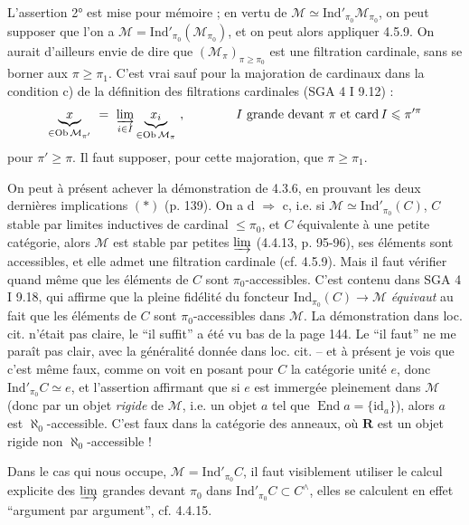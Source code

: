 \documentclass[11pt]{article}
\newcommand{\msp}[1]{\marginpar{\footnotesize [#1]}}
\newcommand{\Ind}{\mathrm{Ind}}
\begin{document}
L'assertion 2° est mise pour mémoire ; en vertu de $\mathcal{M}\simeq\Ind'_{\pi_0}\mathcal{M}_{\pi_0}$, on peut supposer que l'on a $\mathcal{M}=\Ind'_{\pi_0}(\mathcal{M}_{\pi_0})$, et on peut alors appliquer 4.5.9. On aurait d'ailleurs envie de dire que $(\mathcal{M}_\pi)_{\pi\geqslant\pi_0}$ est une filtration cardinale, sans se borner aux $\pi\geqslant\pi_1$. C'est vrai sauf pour la majoration de cardinaux dans la condition c) de la définition des filtrations cardinales (SGA 4 I 9.12) :
\[
\underbrace{x}_{\in\operatorname{Ob}\mathcal{M}_{\pi'}} \ =\ \varinjlim_{i\in I}\underbrace{x_i}_{\in\operatorname{Ob}\mathcal{M}_{\pi}}\ , \qquad\qquad \text{$I$ grande devant $\pi$ et $\operatorname{card}I\leqslant\pi'^{\pi}$}
\]
pour $\pi'\geqslant\pi$. Il faut supposer, pour cette majoration, que $\pi\geqslant\pi_1$.

\msp{page 147}

On peut à présent achever la démonstration de 4.3.6, en prouvant les deux dernières implications $(*)$ (p. 139). On a d $\Longrightarrow$ c, i.e. si $\mathcal{M}\simeq\Ind'_{\pi_0}(C)$, $C$ stable par limites inductives de cardinal $\leqslant\pi_0$, et $C$ équivalente à une petite catégorie, alors $\mathcal{M}$ est stable par petites $\varinjlim$ (4.4.13, p. 95-96), ses éléments sont accessibles, et elle admet une filtration cardinale (cf. 4.5.9). Mais il faut vérifier quand même que les éléments de $C$ sont $\pi_0$-accessibles. C'est contenu dans SGA 4 I 9.18, qui affirme que la pleine fidélité du foncteur $\Ind_{\pi_0}(C)\longrightarrow\mathcal{M}$ \textit{équivaut} au fait que les éléments de $C$ sont $\pi_0$-accessibles dans $\mathcal{M}$. La démonstration dans loc. cit. n'était pas claire, le “il suffit” a été vu bas de la page 144. Le “il faut” ne me paraît pas clair, avec la généralité donnée dans loc. cit. – et à présent je vois que c'est même faux, comme on voit en posant pour $C$ la catégorie unité $e$, donc $\Ind'_{\pi_0}C\simeq e$, et l'assertion affirmant que si $e$ est immergée pleinement dans $\mathcal{M}$ (donc par un objet \textit{rigide} de $\mathcal{M}$, i.e. un objet $a$ tel que $\operatorname{End}a=\{\mathrm{id}_a\}$), alors $a$ est $\aleph_0$-accessible. C'est faux dans la catégorie des anneaux, où $\mathbf{R}$ est un objet rigide non $\aleph_0$-accessible !

\msp{page 148}

Dans le cas qui nous occupe, $\mathcal{M}=\Ind'_{\pi_0}C$, il faut visiblement utiliser le calcul explicite des $\varinjlim$ grandes devant $\pi_0$ dans $\Ind'_{\pi_0}C\subset C^{\wedge}$, elles se calculent en effet “argument par argument”, cf. 4.4.15.
\end{document}
